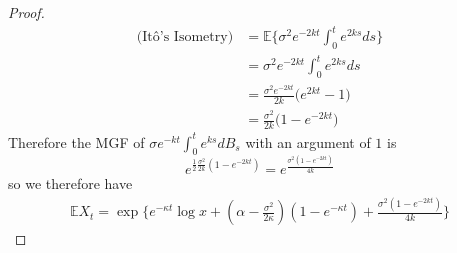 \documentclass[11pt]{article}
\newcommand{\ga}{\alpha}
\newcommand{\gk}{\kappa}
\newcommand{\gs}{\sigma}
\newcommand{\E}{\mathbb{E}}
\begin{document}
\begin{enumerate}
\begin{proof}
\begin{align*}
\text{(It\^o's Isometry)} &= \E\Big\{ \gs^2 e^{-2kt} \int_0^t e^{2ks} ds\Big\}\\
&= \gs^2 e^{-2kt} \int_0^t e^{2ks} ds\\
&= \frac{\gs^2 e^{-2kt} }{2k} \Big( e^{2kt}-1\Big)\\
&= \frac{\gs^2}{2k} \Big(1 - e^{-2kt} \Big)
\end{align*}
Therefore the MGF of $\gs e^{-kt} \int_0^t e^{ks} dB_s$ with an argument of $1$ is $$e^{ \frac{1}{2} \frac{\gs^2}{2k} (1 - e^{-2kt} )}= e^{\frac{\gs^2(1-e^{-2kt})}{4k}}$$
so we therefore have
\begin{align*}
\E X_t = \exp \Big\{ e^{-\gk t} \log x + (\ga -\frac{\gs^2}{2 \gk})(1-e^{-\gk t} )+ \frac{\gs^2(1-e^{-2kt})}{4k}\Big\} 
\end{align*}
 \end{proof}
 \end{enumerate}
\end{document}
